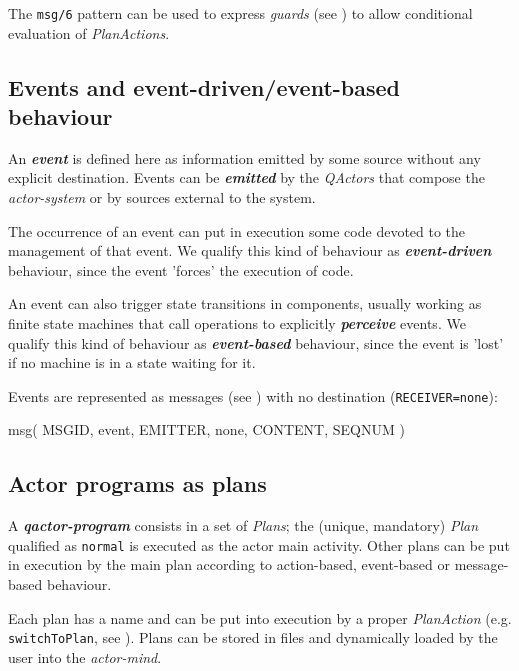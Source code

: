 The \texttt{msg/6} pattern can be used to express \textit{guards} (see ) to allow conditional evaluation of \textit{PlanActions}.

\subsection{Events and event-driven/event-based behaviour } 
 
An \textbf{\textit{event}} is defined here as information emitted by some source without any explicit destination. Events can be \textit{\textbf{emitted}} by the \textit{QActors} that compose the \textit{actor-system} or by sources external to the system.

The occurrence of an event can put in execution some code devoted to the management of that event. We qualify this kind of behaviour as \textit{\textbf{event-driven}} behaviour, since the event 'forces' the execution of code.

An event can also trigger state transitions in components, usually working as finite state machines that call operations to explicitly \textit{\textbf{perceive}} events. We qualify this kind of behaviour as \textit{\textbf{event-based}} behaviour, since the event is 'lost' if no machine is in a state waiting for it.

Events are represented as messages (see ) with no destination (\texttt{RECEIVER=none}):

\begin{qacode}
msg( MSGID, event, EMITTER, none, CONTENT, SEQNUM )
\end{qacode}

 

\subsection{Actor programs as plans}
 
A \textit{\textbf{qactor-program}} consists in a set of \textit{Plans}; the (unique, mandatory) \textit{Plan} qualified as \texttt{normal} is executed as the actor main activity. Other plans can be put in execution by the main plan according to action-based, event-based or message-based behaviour.

Each plan has a name and can be put into execution by a proper \textit{PlanAction} (e.g. \texttt{switchToPlan}, see ). Plans can be stored in files and dynamically loaded by the user into the \textit{actor-mind}.

